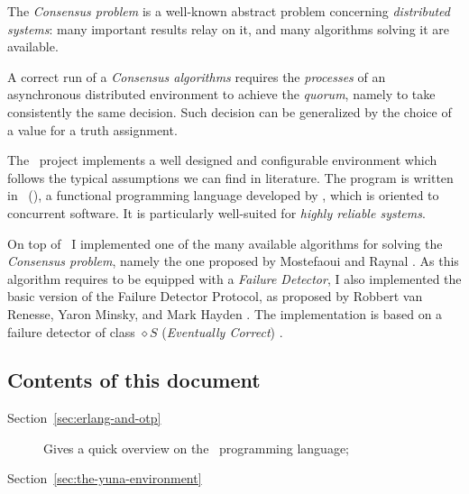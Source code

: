 The \emph{Consensus problem} is a well-known abstract problem concerning
\emph{distributed systems}: many important results relay on it, and many
algorithms solving it are available.

A correct run of a \emph{Consensus algorithms} requires the
\emph{processes} of an asynchronous distributed environment to achieve the
\emph{quorum}, namely to take consistently the same decision. Such
decision can be generalized by the choice of a value for a truth
assignment.

The \YUNA\ project implements a well designed and configurable environment
which follows the typical assumptions we can find in literature. The
program is written in \Erlang\ (), a functional
programming language developed by , which is oriented to
concurrent software. It is particularly well-suited for \emph{highly
reliable systems}.

On top of \YUNA\ I implemented one of the many available algorithms for
solving the \emph{Consensus problem}, namely the one proposed by
Mostefaoui and Raynal \cite{bib:Cons}. As this algorithm requires to be
equipped with a \emph{Failure Detector}, I also implemented the basic
version of the Failure Detector Protocol, as proposed by Robbert van
Renesse, Yaron Minsky, and Mark Hayden \cite{bib:FD}. The implementation
is based on a failure detector of class $\diamond S$ (\emph{Eventually
Correct}) \cite{bib:QualityFD}.

\subsection{Contents of this document}

\begin{description}

    \item[Section~\ref{sec:erlang-and-otp}] Gives a quick overview on the
        \Erlang\ programming language;

    \item[Section~\ref{sec:the-yuna-environment}]

\end{description}
